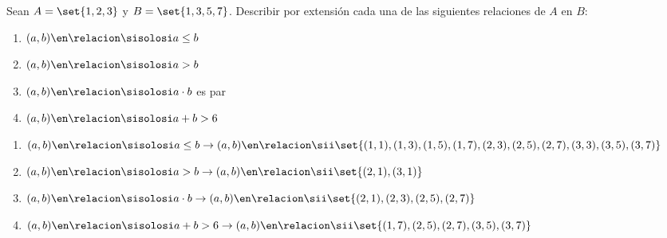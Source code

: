 \begin{enunciado}{\ejercicio}
  Sean $A = \set{1, 2, 3}$ y $B = \set{1, 3, 5, 7}$. Describir por extensión cada una de las
  siguientes relaciones de $A$ en $B$:

  \begin{multicols}{2}
    \begin{enumerate}[label=\roman*)]
      \item $(a,b) \en \relacion \sisolosi a \leq b $

      \item $(a,b) \en \relacion \sisolosi a > b$

      \item $(a,b) \en \relacion \sisolosi a \cdot b$ es par

      \item $(a,b) \en \relacion \sisolosi a + b > 6$
    \end{enumerate}
  \end{multicols}
\end{enunciado}

\begin{enumerate}[label=\roman*)]
  \item $(a,b) \en \relacion \sisolosi a\leq b \to   (a,b) \en \relacion \sii   \set{(1,1), (1,3), (1,5), (1,7), (2,3), (2,5), (2,7), (3,3), (3,5), (3,7)}$

  \item $(a,b) \en \relacion \sisolosi a > b \to     (a,b) \en \relacion \sii   \set{(2,1), (3, 1)}$

  \item $(a,b) \en \relacion \sisolosi a \cdot b \to (a,b) \en \relacion \sii    \set{(2,1), (2,3), (2,5), (2,7)}$

  \item $(a,b) \en \relacion \sisolosi a + b > 6 \to (a,b) \en \relacion \sii\set{(1,7), (2,5), (2, 7), (3, 5), (3, 7)}$
\end{enumerate}
